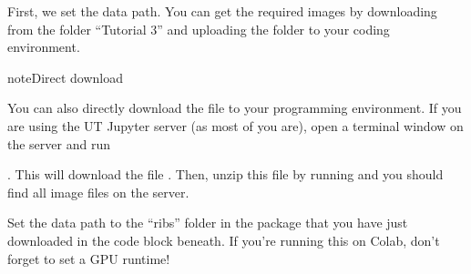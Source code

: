 \documentclass[letterpaper,10pt,english]{jupyterBook}
\begin{document}
\sphinxAtStartPar


\sphinxAtStartPar
First, we set the data path. You can get the required images by downloading  from the folder “Tutorial 3”  and uploading the folder to your coding environment.

\begin{sphinxadmonition}{note}{Direct download}

\sphinxAtStartPar
You can also directly download the file to your programming environment. If you are using the UT Jupyter server (as most of you are), open a terminal window on the server and run

\sphinxAtStartPar
{}. This will download the file . Then, unzip this file by running  and you should find all image files on the server.
\end{sphinxadmonition}

\sphinxAtStartPar
Set the data path to the “ribs” folder in the package that you have just downloaded in the code block beneath. If you’re running this on Colab, don’t forget to set a GPU runtime!
\end{document}
